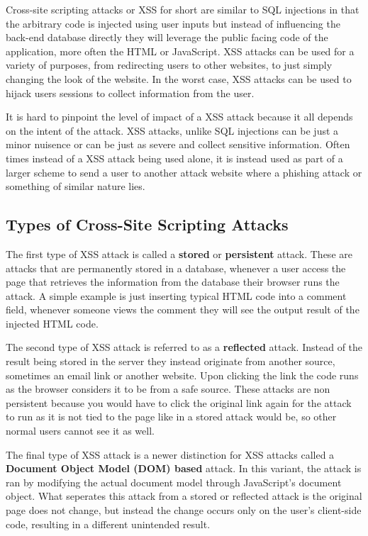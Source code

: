 Cross-site scripting attacks or XSS for short are similar to SQL injections in that the arbitrary code is injected using user inputs but instead of influencing the back-end database directly they will leverage the public facing code of the application, more often the HTML or JavaScript.  XSS attacks can be used for a variety of purposes, from redirecting users to other websites, to just simply changing the look of the website.  In the worst case, XSS attacks can be used to hijack users sessions to collect information from the user.

It is hard to pinpoint the level of impact of a XSS attack because it all depends on the intent of the attack.  XSS attacks, unlike SQL injections can be just a minor nuisence or can be just as severe and collect sensitive information.  Often times instead of a XSS attack being used alone, it is instead used as part of a larger scheme to send a user to another attack website where a phishing attack or something of similar nature lies.  \cite{aSurveyOnWeb} \cite{xssdm}

\subsection{Types of Cross-Site Scripting Attacks}\label{sec:xssTypes}

The first type of XSS attack is called a \textbf{stored} or \textbf{persistent} attack.  These are attacks that are permanently stored in a database, whenever a user access the page that retrieves the information from the database their browser runs the attack. A simple example is just inserting typical HTML code into a comment field, whenever someone views the comment they will see the output result of the injected HTML code.

The second type of XSS attack is referred to as a \textbf{reflected} attack.  Instead of the result being stored in the server they instead originate from another source, sometimes an email link or another website.  Upon clicking the link the code runs as the browser considers it  to be from a safe source.  These attacks are non persistent because you would have to click the original link again for the attack to run as it is not tied to the page like in a stored attack would be, so other normal users cannot see it as well. \cite{owaspXSS}

The final type of XSS attack is a newer distinction for XSS attacks called a \textbf{Document Object Model (DOM) based} attack.  In this variant, the attack is ran by modifying the actual document model through JavaScript's document object.  What seperates this attack from a stored or reflected attack is the original page does not change, but instead the change occurs only on the user's client-side code, resulting in a different unintended result. \cite{owaspXSSDOM}

